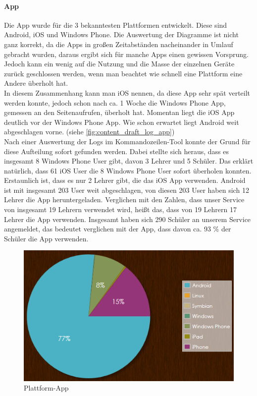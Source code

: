 \paragraph{App\\}
Die App wurde für die 3 bekanntesten Plattformen entwickelt. Diese sind Android, iOS und Windows Phone. Die Auswertung der Diagramme ist nicht ganz korrekt, da die Apps in großen Zeitabständen nacheinander in Umlauf gebracht wurden, daraus ergibt sich für manche Apps einen gewissen Vorsprung. Jedoch kann ein wenig auf die Nutzung und die Masse der einzelnen Geräte zurück geschlossen werden, wenn man beachtet wie schnell eine Plattform eine Andere überholt hat.\\
In diesem Zusammenhang kann man iOS nennen, da diese App sehr spät verteilt werden konnte, jedoch schon nach ca. 1 Woche die Windows Phone App, gemessen an den Seitenaufrufen, überholt hat. Momentan liegt die iOS App deutlich vor der Windows Phone App. Wie schon erwartet liegt Android weit abgeschlagen vorne. (siehe \autoref{fig:content_draft_log_app})\\
Nach einer Auswertung der Logs im Kommandozeilen-Tool konnte der Grund für diese Aufteilung sofort gefunden werden. Dabei stellte sich heraus, dass es insgesamt 8 Windows Phone User gibt, davon 3 Lehrer und 5 Schüler. Das erklärt natürlich, dass 61 iOS User die 8 Windows Phone User sofort überholen konnten. Erstaunlich ist, dass es nur 2 Lehrer gibt, die das iOS App verwenden. Android ist mit insgesamt 203 User weit abgeschlagen, von diesen 203 User haben sich 12 Lehrer die App heruntergeladen. Verglichen mit den Zahlen, dass unser Service von insgesamt 19 Lehrern verwendet wird, heißt das, dass von 19 Lehrern 17 Lehrer die App verwenden. Insgesamt haben sich 290 Schüler an unserem Service angemeldet, das bedeutet verglichen mit der App, dass davon ca. 93 \% der Schüler die App verwenden. 
\begin{figure}[H]
\centering
\includegraphics[keepaspectratio=true, width=12cm]{images/screenshots/statistics/app_plattform.png}
\caption{Plattform-App}
\label{fig:content_draft_log_app}
\end{figure}

